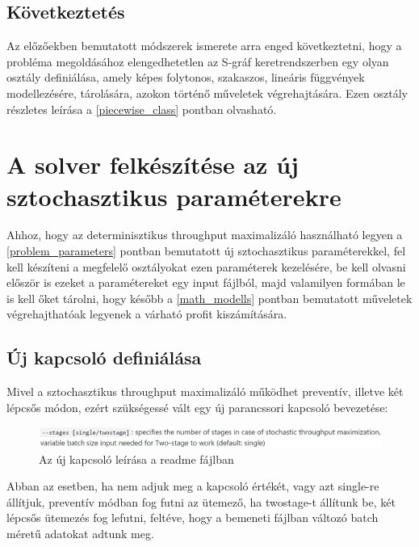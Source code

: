 \subsection{Következtetés} \label{piecewise_suggestion}
Az előzőekben bemutatott módszerek ismerete arra enged következtetni, hogy a probléma megoldásához elengedhetetlen az S-gráf keretrendszerben egy olyan osztály definiálása, amely képes  folytonos, szakaszos, lineáris függvények modellezésére, tárolására, azokon történő műveletek végrehajtására. Ezen osztály részletes leírása a \ref{piecewise_class} pontban olvasható.
\section{A solver felkészítése az új sztochasztikus paraméterekre}
Ahhoz, hogy az determinisztikus throughput maximalizáló használható legyen a \ref{problem_parameters} pontban bemutatott új sztochasztikus paraméterekkel, fel kell készíteni a megfelelő osztályokat ezen paraméterek kezelésére, be kell olvasni először is ezeket a paramétereket egy input fájlból, majd valamilyen formában le is kell őket tárolni, hogy később a \ref{math_modells} pontban bemutatott műveletek végrehajthatóak legyenek a várható profit kiszámítására.
\subsection{Új kapcsoló definiálása}
Mivel a sztochasztikus throughput maximalizáló működhet preventív, illetve két lépcsős módon, ezért szükségessé vált egy új parancssori kapcsoló bevezetése:
\begin{figure}[H]
\begin{center}
\includegraphics[scale=0.38]{switch}
\caption{Az új kapcsoló leírása a readme fájlban}
\label{switch}
\end{center}
\end{figure}
Abban az esetben, ha nem adjuk meg a kapcsoló értékét, vagy azt single-re állítjuk, preventív módban fog futni az ütemező, ha twostage-t állítunk be, két lépcsős ütemezés fog lefutni, feltéve, hogy a bemeneti fájlban változó batch méretű adatokat adtunk meg.
